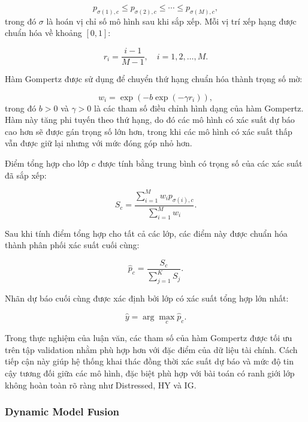 \documentclass[10pt,twoside]{article}
\begin{document}
\begin{equation}
    p_{\sigma(1),c} \leq p_{\sigma(2),c} \leq \cdots \leq p_{\sigma(M),c},
\end{equation}
trong đó $\sigma$ là hoán vị chỉ số mô hình sau khi sắp xếp. Mỗi vị trí xếp hạng được chuẩn hóa về khoảng $[0,1]$:

\begin{equation}
    r_i = \frac{i-1}{M-1}, \quad i=1,2,\ldots,M.
\end{equation}

Hàm Gompertz được sử dụng để chuyển thứ hạng chuẩn hóa thành trọng số mờ:

\begin{equation}
    w_i = \exp\left(-b\exp(-\gamma r_i)\right),
\end{equation}
trong đó $b>0$ và $\gamma>0$ là các tham số điều chỉnh hình dạng của hàm Gompertz. Hàm này tăng phi tuyến theo thứ hạng, do đó các mô hình có xác suất dự báo cao hơn sẽ được gán trọng số lớn hơn, trong khi các mô hình có xác suất thấp vẫn được giữ lại nhưng với mức đóng góp nhỏ hơn.

Điểm tổng hợp cho lớp $c$ được tính bằng trung bình có trọng số của các xác suất đã sắp xếp:

\begin{equation}
    S_c = \frac{\sum_{i=1}^{M} w_i p_{\sigma(i),c}}
    {\sum_{i=1}^{M} w_i}.
\end{equation}

Sau khi tính điểm tổng hợp cho tất cả các lớp, các điểm này được chuẩn hóa thành phân phối xác suất cuối cùng:

\begin{equation}
    \hat{p}_c = \frac{S_c}{\sum_{j=1}^{K} S_j}.
\end{equation}

Nhãn dự báo cuối cùng được xác định bởi lớp có xác suất tổng hợp lớn nhất:

\begin{equation}
    \hat{y} = \arg\max_c \hat{p}_c.
\end{equation}

Trong thực nghiệm của luận văn, các tham số của hàm Gompertz được tối ưu trên tập validation nhằm phù hợp hơn với đặc điểm của dữ liệu tài chính. Cách tiếp cận này giúp hệ thống khai thác đồng thời xác suất dự báo và mức độ tin cậy tương đối giữa các mô hình, đặc biệt phù hợp với bài toán có ranh giới lớp không hoàn toàn rõ ràng như Distressed, HY và IG.

\subsubsection{Dynamic Model Fusion}
\end{document}
